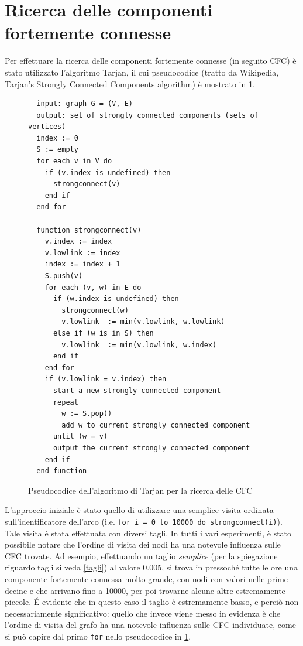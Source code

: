\documentclass[10pt,a4paper]{article}
\begin{document}
\section{Ricerca delle componenti fortemente connesse}
Per effettuare la ricerca delle componenti fortemente connesse (in seguito CFC) è stato utilizzato l'algoritmo Tarjan, il cui pseudocodice (tratto da Wikipedia, \href{http://en.wikipedia.org/wiki/Tarjan''s_strongly_connected_components_algorithm}{Tarjan's Strongly Connected Components algorithm}) è mostrato in \ref{pseudotarjan}.
\begin{figure}
\begin{verbatim}
  input: graph G = (V, E)
  output: set of strongly connected components (sets of vertices)
  index := 0
  S := empty
  for each v in V do
    if (v.index is undefined) then
      strongconnect(v)
    end if
  end for

  function strongconnect(v)
    v.index := index
    v.lowlink := index
    index := index + 1
    S.push(v)
    for each (v, w) in E do
      if (w.index is undefined) then
        strongconnect(w)
        v.lowlink  := min(v.lowlink, w.lowlink)
      else if (w is in S) then
        v.lowlink  := min(v.lowlink, w.index)
      end if
    end for
    if (v.lowlink = v.index) then
      start a new strongly connected component
      repeat
        w := S.pop()
        add w to current strongly connected component
      until (w = v)
      output the current strongly connected component
    end if
  end function
\end{verbatim}
\caption{Pseudocodice dell'algoritmo di Tarjan per la ricerca delle CFC}
\label{pseudotarjan}
\end{figure}
L'approccio iniziale è stato quello di utilizzare una semplice visita ordinata sull'identificatore dell'arco (i.e. \texttt{for i = 0 to 10000 do strongconnect(i)}). Tale visita è stata effettuata con diversi tagli. In tutti i vari esperimenti, è stato possibile notare che l'ordine di visita dei nodi ha una notevole influenza sulle CFC trovate. Ad esempio, effettuando un taglio \emph{semplice} (per la spiegazione riguardo tagli si veda \ref{tagli}) al valore 0.005, si trova in pressoché tutte le ore una componente fortemente connessa molto grande, con nodi con valori nelle prime decine e che arrivano fino a 10000, per poi trovarne alcune altre estremamente piccole.
\'E evidente che in questo caso il taglio è estremamente basso, e perciò non necessariamente significativo: quello che invece viene messo in evidenza è che l'ordine di visita del grafo ha una notevole influenza sulle CFC individuate, come si può capire dal primo \texttt{for} nello pseudocodice in \ref{pseudotarjan}.
\end{document}
